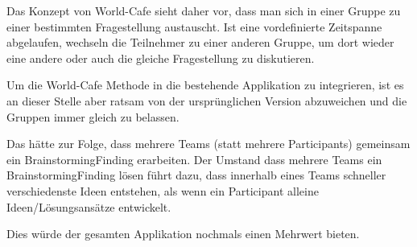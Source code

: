 Das Konzept von World-Cafe sieht daher vor, dass man sich in einer Gruppe zu einer bestimmten Fragestellung austauscht. Ist eine vordefinierte Zeitspanne abgelaufen, wechseln die Teilnehmer zu einer anderen Gruppe, um dort wieder eine andere oder auch die gleiche Fragestellung zu diskutieren. 

Um die World-Cafe Methode in die bestehende Applikation zu integrieren, ist es an dieser Stelle aber ratsam von der ursprünglichen Version abzuweichen und die Gruppen immer gleich zu belassen. 

Das hätte zur Folge, dass mehrere Teams (statt mehrere Participants) gemeinsam ein BrainstormingFinding erarbeiten. Der Umstand dass mehrere Teams ein BrainstormingFinding lösen führt dazu, dass innerhalb eines Teams schneller verschiedenste Ideen entstehen, als wenn ein Participant alleine Ideen/Lösungsansätze entwickelt. 

Dies würde der gesamten Applikation nochmals einen Mehrwert bieten. 
